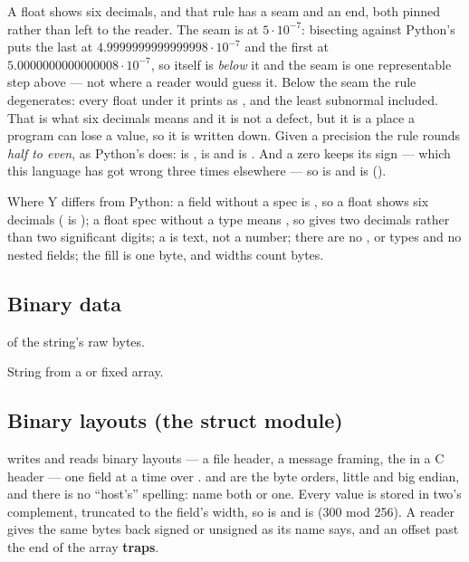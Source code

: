 A float shows six decimals, and that rule has a seam and an end, both pinned
rather than left to the reader. The seam is at $5\cdot10^{-7}$: bisecting against
Python's  puts the last  at
$4.9999999999999998\cdot10^{-7}$ and the first  at
$5.0000000000000008\cdot10^{-7}$, so  itself is \emph{below} it and the
seam is one representable step above --- not where a reader would guess it.
Below the seam the rule degenerates: every float under it prints as
,  and the least subnormal included. That is what six
decimals means and it is not a defect, but it is a place a program can lose a
value, so it is written down. Given a precision the rule rounds \emph{half to
even}, as Python's does:  is ,  is
 and  is . And a zero keeps its sign --- which this
language has got wrong three times elsewhere --- so  is
 and  is 
().

Where Y differs from Python: a field without a spec is , so
a float shows six decimals ( is ); a float
spec without a type means , so  gives two decimals
rather than two significant digits; a  is text, not a number;
there are no ,  or  types and no nested fields; the
fill is one byte, and widths count bytes.

\subsection{Binary data}
\label{sec:builtin-bytes}

\begin{description}[style=nextline,leftmargin=5.2em]
\item[\ic{bytes(s)}] \ic{[byte]} of the string's raw bytes.
\item[\ic{from\_bytes(b)}] String from a \ic{[byte]} or fixed \ic{[byte; N]} array.
\end{description}

\subsection{Binary layouts (the struct module)}
\label{sec:builtin-struct}

\noindent{} writes and reads binary layouts --- a file
header, a message framing, the  in a C header --- one field at
a time over \ic{[byte]}.  and  are the byte orders, little
and big endian, and there is no ``host's'' spelling: name both or one.
Every value is stored in two's complement, truncated to the field's width,
so  is  and  is
 (300 mod 256). A reader gives the same bytes back signed or
unsigned as its name says, and an offset past the end of the array
\textbf{traps}.

